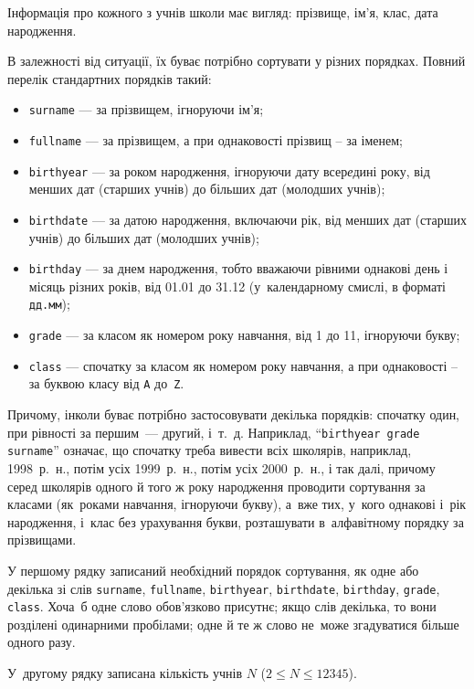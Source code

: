 ﻿Інформація про кожного з учнів школи має вигляд: прізвище, ім'я, клас, дата народження. 

В залежності від ситуації, їх буває потрібно сортувати у різних порядках. Повний перелік стандартних порядків такий:

\begin{itemize}
\item
{\tt surname} ---
за прізвищем, ігноруючи ім'я;
\item
{\tt fullname} ---
за прізвищем, а при однаковості прізвищ -- за іменем;
\item
{\tt birthyear} --- 
за роком народження, ігноруючи дату всер\emph{е}дині року, від менших дат (старших  учнів) до більших дат (молодших учнів);
\item
{\tt birthdate} --- 
за датою народження, включаючи рік, від менших дат (старших  учнів) до більших дат (молодших учнів);
\item
{\tt birthday} --- 
за днем народження, тобто вважаючи рівними однакові день і місяць різних років, від 01.01 до 31.12 (у~календарному смислі, в форматі {\tt дд.мм});
\item
{\tt grade} ---
за класом як номером року навчання, від 1 до 11, ігноруючи букву;
\item
{\tt class} --- 
спочатку за класом як номером року навчання, а при однаковості -- за буквою класу від {\tt A} до~{\tt Z}.
\end{itemize}

Причому, інколи буває потрібно застосовувати декілька порядків: спочатку один, при рівності за першим~--- другий, і~т.~д.
Наприклад, ``{\tt birthyear grade surname}'' означає, що спочатку треба вивести всіх школярів, наприклад, 1998~р.~н., 
потім усіх 1999~р.~н., потім усіх 2000~р.~н., і так далі, причому серед школярів одного й того ж року народження 
проводити сортування за класами (як~роками навчання, ігноруючи букву), а~вже тих, у~кого однакові і~рік народження, 
і~клас без урахування букви, розташувати в~алфавітному порядку за прізвищами.

\InputFile
У першому рядку записаний необхідний порядок сортування, як одне або декілька зі слів 
{\tt surname}, {\tt fullname}, {\tt birthyear}, {\tt birthdate}, {\tt birthday}, {\tt grade}, {\tt class}. 
Хоча~б одне слово обов'язково присутнє; якщо слів декілька, то вони розділені одинарними пробілами; 
одне й те ж слово не~може згадуватися більше одного разу. 

У~другому рядку записана кількість учнів $N$ ($2\leqslant N \leqslant 12345$).

